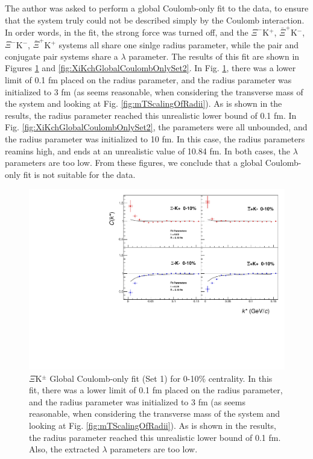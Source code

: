 \documentclass[/home/jesse/Analysis/FemtoAnalysis/AnalysisNotes/AnalysisNoteJBuxton.tex]{subfiles}
\begin{document}
The author was asked to perform a global Coulomb-only fit to the data, to ensure that the system truly could not be described simply by the Coulomb interaction.  In order words, in the fit, the strong force was turned off, and the $\Xi^{-}$K$^{+}$, $\bar{\Xi}^{+}$K$^{-}$, $\Xi^{-}$K$^{-}$, $\bar{\Xi}^{+}$K$^{+}$ systems all share one sinlge radius parameter, while the pair and conjugate pair systems share a $\lambda$ parameter.  The results of this fit are shown in Figures \ref{fig:XiKchGlobalCoulombOnlySet1} and \ref{fig:XiKchGlobalCoulombOnlySet2}.  In Fig. \ref{fig:XiKchGlobalCoulombOnlySet1}, there was a lower limit of 0.1 fm placed on the radius parameter, and the radius parameter was initialized to 3 fm (as seems reasonable, when considering the transverse mass of the system and looking at Fig. \ref{fig:mTScalingOfRadii}).  As is shown in the results, the radius parameter reached this unrealistic lower bound of 0.1 fm.  In Fig. \ref{fig:XiKchGlobalCoulombOnlySet2}, the parameters were all unbounded, and the radius parameter was initialized to 10 fm.  In this case, the radius parameters reamins high, and ends at an unrealistic value of 10.84 fm.  In both cases, the $\lambda$ parameters are too low.  From these figures, we conclude that a global Coulomb-only fit is not suitable for the data.

\begin{figure}[h]
  \centering
  \includegraphics[width=\textwidth]{7_ResultsAndDiscussion/Figures/GlobalCoulombOnlyFit_Set1.pdf}
  \caption[$\Xi$K$^{\pm}$ Global Coulomb-Only Fit (Set 1)]{$\Xi$K$^{\pm}$ Global Coulomb-only fit (Set 1) for 0-10\% centrality.  In this fit, there was a lower limit of 0.1 fm placed on the radius parameter, and the radius parameter was initialized to 3 fm (as seems reasonable, when considering the transverse mass of the system and looking at Fig. \ref{fig:mTScalingOfRadii}).  As is shown in the results, the radius parameter reached this unrealistic lower bound of 0.1 fm.  Also, the extracted $\lambda$ parameters are too low.}
  \label{fig:XiKchGlobalCoulombOnlySet1}
\end{figure}
\end{document}

